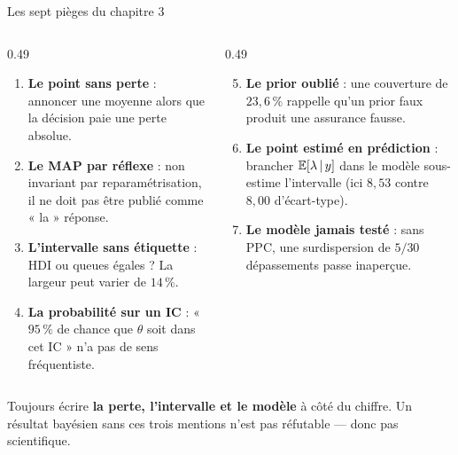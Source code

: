 \begin{frame}{Les sept pièges du chapitre 3}
\small
\vspace{-3mm}
\begin{columns}[t]
\begin{column}{0.49\textwidth}
\begin{wbox}[Pièges 1 à 4]
\begin{enumerate}
  \item \textbf{Le point sans perte} : annoncer une moyenne alors que la
        décision paie une perte absolue.
  \item \textbf{Le MAP par réflexe} : non invariant par reparamétrisation, il ne
        doit pas être publié comme « la » réponse.
  \item \textbf{L'intervalle sans étiquette} : HDI ou queues égales ? La largeur
        peut varier de $14\,\%$.
  \item \textbf{La probabilité sur un IC} : « $95\,\%$ de chance que $\theta$ soit
        dans cet IC » n'a pas de sens fréquentiste.
\end{enumerate}
\end{wbox}
\end{column}
\begin{column}{0.49\textwidth}
\begin{wbox}[Pièges 5 à 7]
\begin{enumerate}
  \setcounter{enumi}{4}
  \item \textbf{Le prior oublié} : une couverture de $23{,}6\,\%$ rappelle qu'un
        prior faux produit une assurance fausse.
  \item \textbf{Le point estimé en prédiction} : brancher $\mathbb{E}[\lambda \,\vert\, y]$
        dans le modèle sous-estime l'intervalle (ici $8{,}53$ contre $8{,}00$
        d'écart-type).
  \item \textbf{Le modèle jamais testé} : sans PPC, une surdispersion de
        $5/30$ dépassements passe inaperçue.
\end{enumerate}
\end{wbox}
\end{column}
\end{columns}
\vspace{1mm}
\begin{kbox}
Toujours écrire \textbf{la perte, l'intervalle et le modèle} à côté du chiffre.
Un résultat bayésien sans ces trois mentions n'est pas réfutable --- donc pas scientifique.
\end{kbox}
\end{frame}

